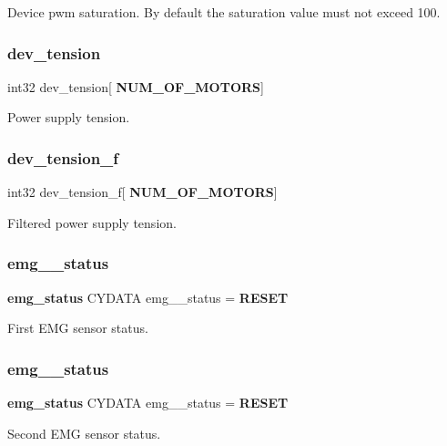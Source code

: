 Device pwm saturation. By default the saturation value must not exceed 100. \mbox{\label{globals_8c_aada869b6650bdd87ca481109ae08231c}} 
\subsubsection{dev\+\_\+tension}
{\footnotesize\ttfamily int32 dev\+\_\+tension[\textbf{ N\+U\+M\+\_\+\+O\+F\+\_\+\+M\+O\+T\+O\+RS}]}

Power supply tension. \mbox{\label{globals_8c_aa2494c7cd8f096ca7f2ead0a1430a597}} 
\subsubsection{dev\+\_\+tension\+\_\+f}
{\footnotesize\ttfamily int32 dev\+\_\+tension\+\_\+f[\textbf{ N\+U\+M\+\_\+\+O\+F\+\_\+\+M\+O\+T\+O\+RS}]}

Filtered power supply tension. \mbox{\label{globals_8c_a433230c4343adf14967e6f4f9082b199}} 
\subsubsection{emg\+\_\+\_\+status}
{\footnotesize\ttfamily \textbf{ emg\+\_\+status} C\+Y\+D\+A\+TA emg\+\_\+\_\+status = \textbf{ R\+E\+S\+ET}}

First E\+MG sensor status. \mbox{\label{globals_8c_a7eef8180f636a73854d52b58e2be4e51}} 
\subsubsection{emg\+\_\+\_\+status}
{\footnotesize\ttfamily \textbf{ emg\+\_\+status} C\+Y\+D\+A\+TA emg\+\_\+\_\+status = \textbf{ R\+E\+S\+ET}}

Second E\+MG sensor status. \mbox{\label{globals_8c_aad3d2663356b48553e2b22e0a9fd917e}} 
